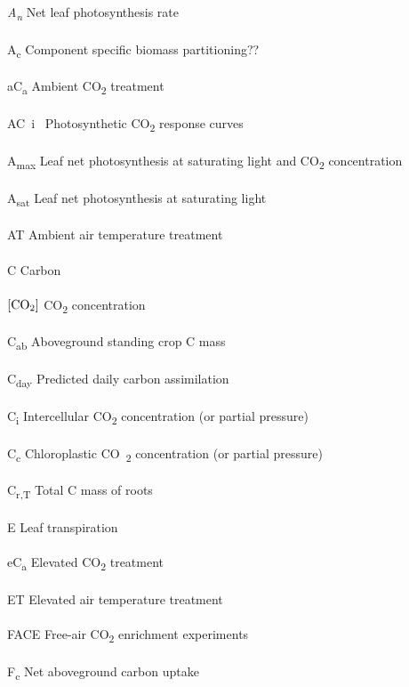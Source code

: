 \documentclass[a4paper]{article}\usepackage[]{graphicx}\usepackage[]{color}
\begin{document}
\textit{A\textsubscript{n}}  Net leaf photosynthesis rate
\\
\\
A\textsubscript{c} Component specific biomass partitioning??
\\
\\
aC\textsubscript{a} Ambient CO\textsubscript{2} treatment
\\
\\
AC~i~ Photosynthetic CO\textsubscript{2} response curves 
\\
\\
A\textsubscript{max} Leaf net photosynthesis at saturating light and CO\textsubscript{2} concentration
\\
\\
A\textsubscript{sat} Leaf net photosynthesis at saturating light
\\
\\
AT  Ambient air temperature treatment
\\
\\
C Carbon
\\
\\
$[\textrm{CO\textsubscript{2}}]$ CO\textsubscript{2} concentration
\\
\\
C\textsubscript{ab} Aboveground standing crop C mass
\\
\\
C\textsubscript{day} Predicted daily carbon assimilation
\\
\\
C\textsubscript{i} Intercellular CO\textsubscript{2} concentration (or partial pressure)
\\
\\
C\textsubscript{c} Chloroplastic CO~\textsubscript{2} concentration (or partial pressure)
\\
\\
C\textsubscript{r,T}  Total C mass of roots
\\
\\
E Leaf transpiration
\\
\\
eC\textsubscript{a} Elevated CO\textsubscript{2} treatment
\\
\\
ET  Elevated air temperature treatment
\\
\\
FACE Free-air CO\textsubscript{2} enrichment experiments
\\
\\
F\textsubscript{c}  Net aboveground carbon uptake
\end{document}
